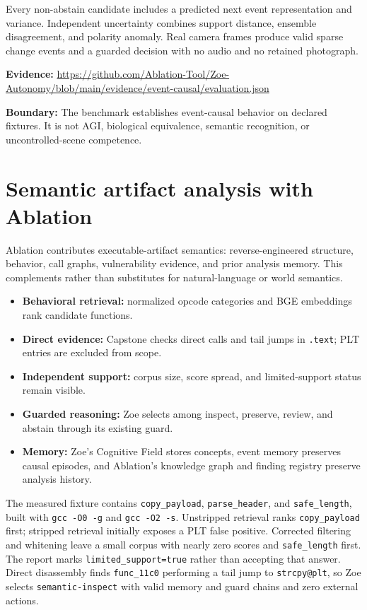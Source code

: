 \documentclass[11pt]{article}
\newcommand{\boundary}[1]{\par\smallskip\small\color{ZoeGray}\textbf{Boundary:} #1\normalsize\par\smallskip}
\newcommand{\evidence}[1]{\par\smallskip\small\color{ZoeGray}\textbf{Evidence:} #1\normalsize\par\smallskip}
\begin{document}
Every non-abstain candidate includes a predicted next event representation and variance. Independent uncertainty combines support distance, ensemble disagreement, and polarity anomaly. Real camera frames produce valid sparse change events and a guarded decision with no audio and no retained photograph.

\evidence{\url{https://github.com/Ablation-Tool/Zoe-Autonomy/blob/main/evidence/event-causal/evaluation.json}}
\boundary{The benchmark establishes event-causal behavior on declared fixtures. It is not AGI, biological equivalence, semantic recognition, or uncontrolled-scene competence.}

\clearpage
\section{Semantic artifact analysis with Ablation}

Ablation contributes executable-artifact semantics: reverse-engineered structure, behavior, call graphs, vulnerability evidence, and prior analysis memory. This complements rather than substitutes for natural-language or world semantics.

\begin{itemize}
  \item \textbf{Behavioral retrieval:} normalized opcode categories and BGE embeddings rank candidate functions.
  \item \textbf{Direct evidence:} Capstone checks direct calls and tail jumps in \texttt{.text}; PLT entries are excluded from scope.
  \item \textbf{Independent support:} corpus size, score spread, and limited-support status remain visible.
  \item \textbf{Guarded reasoning:} Zoe selects among inspect, preserve, review, and abstain through its existing guard.
  \item \textbf{Memory:} Zoe's Cognitive Field stores concepts, event memory preserves causal episodes, and Ablation's knowledge graph and finding registry preserve analysis history.
\end{itemize}

The measured fixture contains \texttt{copy\_payload}, \texttt{parse\_header}, and \texttt{safe\_length}, built with \texttt{gcc -O0 -g} and \texttt{gcc -O2 -s}. Unstripped retrieval ranks \texttt{copy\_payload} first; stripped retrieval initially exposes a PLT false positive. Corrected filtering and whitening leave a small corpus with nearly zero scores and \texttt{safe\_length} first. The report marks \texttt{limited\_support=true} rather than accepting that answer. Direct disassembly finds \texttt{func\_11c0} performing a tail jump to \texttt{strcpy@plt}, so Zoe selects \texttt{semantic-inspect} with valid memory and guard chains and zero external actions.
\end{document}
